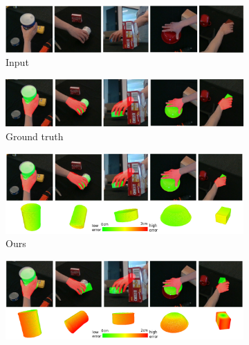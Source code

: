 \begin{figure}[!ht]
    \begin{subfigure}{0.98\textwidth}
        \includegraphics[width=\linewidth]{figs/2_rgb}
        \caption{Input}
    \end{subfigure}
    \hfill
    \begin{subfigure}{0.98\textwidth}
        \includegraphics[width=\linewidth]{figs/2_0}
        \caption{Ground truth}
    \end{subfigure}
    \hfill
    \begin{subfigure}{0.98\textwidth}
        \includegraphics[width=\linewidth]{figs/2_1}
        \caption{Ours}
    \end{subfigure}
    \hfill
    \begin{subfigure}{0.98\textwidth}
        \includegraphics[width=\linewidth]{figs/2_2}
        \caption{\cite{wang2023deep}}
    \end{subfigure}
    \hfill
    \begin{subfigure}{0.98\textwidth}

\end{subfigure}
\end{figure}
